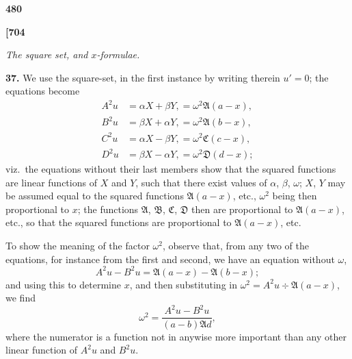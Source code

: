 \documentclass[12pt,a4paper]{article}
\theoremstyle{definition}
\begin{document}
\vspace{1em}

\begin{center}
\textbf{480}
\end{center}

\vspace{0.5em}

\noindent\textbf{[704}

\vspace{0.5em}

\begin{center}
\textit{The square set, and $x$-formulae.}
\end{center}

\vspace{0.5em}

\noindent\textbf{37.}\quad
We use the square-set, in the first instance by writing therein $u' = 0$; the equations become
\begin{align*}
A^2 u &= \alpha X + \beta Y, = \omega^2 \mathfrak{A}(a - x), \\
B^2 u &= \beta X + \alpha Y, = \omega^2 \mathfrak{A}(b - x), \\
C^2 u &= \alpha X - \beta Y, = \omega^2 \mathfrak{C}(c - x), \\
D^2 u &= \beta X - \alpha Y, = \omega^2 \mathfrak{D}(d - x);
\end{align*}
viz.\ the equations without their last members show that the squared functions are linear functions of $X$ and $Y$, such that there exist values of $\alpha$, $\beta$, $\omega$; $X$, $Y$ may be assumed equal to the squared functions $\mathfrak{A}(a - x)$, etc., $\omega^2$ being then proportional to $x$; the functions $\mathfrak{A}$, $\mathfrak{B}$, $\mathfrak{C}$, $\mathfrak{D}$ then are proportional to $\mathfrak{A}(a - x)$, etc., so that the squared functions are proportional to $\mathfrak{A}(a - x)$, etc.

To show the meaning of the factor $\omega^2$, observe that, from any two of the equations, for instance from the first and second, we have an equation without $\omega$,
\[
A^2 u - B^2 u = \mathfrak{A}(a - x) - \mathfrak{A}(b - x);
\]
and using this to determine $x$, and then substituting in $\omega^2 = A^2 u \div \mathfrak{A}(a - x)$, we find
\[
\omega^2 = \frac{A^2 u - B^2 u}{(a - b)\mathfrak{A}d},
\]
where the numerator is a function not in anywise more important than any other linear function of $A^2 u$ and $B^2 u$.

\vspace{1em}
\end{document}
